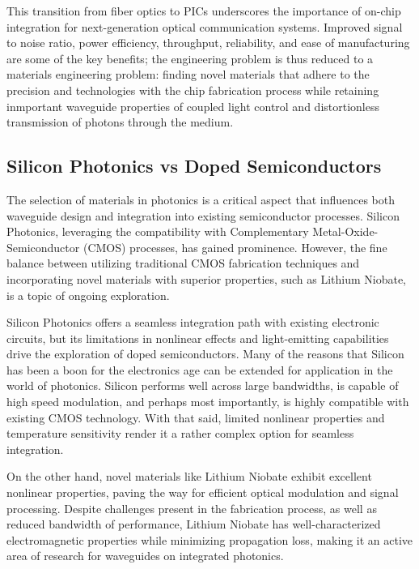 \documentclass[10pt]{article}
\begin{document}
This transition from fiber optics to PICs underscores the importance of on-chip integration for next-generation optical communication systems. Improved signal to noise ratio, power efficiency, throughput, reliability, and ease of manufacturing are some of the key benefits; the engineering problem is thus reduced to a 
materials engineering problem: finding novel materials that adhere to the precision and technologies with the chip fabrication process while retaining inmportant waveguide 
properties of coupled light control and distortionless transmission of photons through the medium.

\subsection{Silicon Photonics vs Doped Semiconductors}

The selection of materials in photonics is a critical aspect that influences both waveguide design and integration into existing semiconductor processes. 
Silicon Photonics, leveraging the compatibility with Complementary Metal-Oxide-Semiconductor (CMOS) processes, has gained prominence. However, the fine balance between utilizing traditional CMOS fabrication techniques and incorporating novel materials with superior properties, such as Lithium Niobate, is a topic of ongoing exploration.

Silicon Photonics offers a seamless integration path with existing electronic circuits, but its limitations in nonlinear effects and light-emitting capabilities drive the exploration of doped semiconductors. Many of the 
reasons that Silicon has been a boon for the electronics age can be extended for application in the world of photonics. Silicon performs well across large bandwidths, is capable of high speed modulation, and perhaps most importantly, is highly compatible with existing CMOS technology.
With that said, limited nonlinear properties and temperature sensitivity render it a rather complex option for seamless integration.

On the other hand, novel materials like Lithium Niobate exhibit excellent nonlinear properties, paving the way for efficient optical modulation and signal processing. Despite 
challenges present in the fabrication process, as well as reduced bandwidth of performance, Lithium Niobate has well-characterized electromagnetic properties while minimizing propagation loss, 
making it an active area of research for waveguides on integrated photonics.
\end{document}

